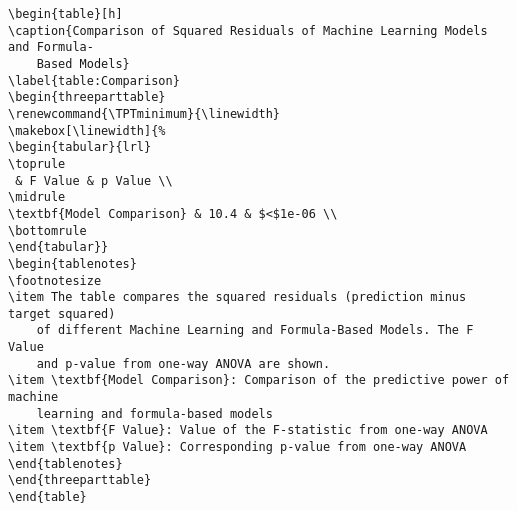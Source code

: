 \documentclass[11pt]{article}
\begin{document}
\begin{Verbatim}[tabsize=4]
\begin{table}[h]
\caption{Comparison of Squared Residuals of Machine Learning Models and Formula-
	Based Models}
\label{table:Comparison}
\begin{threeparttable}
\renewcommand{\TPTminimum}{\linewidth}
\makebox[\linewidth]{%
\begin{tabular}{lrl}
\toprule
 & F Value & p Value \\
\midrule
\textbf{Model Comparison} & 10.4 & $<$1e-06 \\
\bottomrule
\end{tabular}}
\begin{tablenotes}
\footnotesize
\item The table compares the squared residuals (prediction minus target squared)
	of different Machine Learning and Formula-Based Models. The F Value
	and p-value from one-way ANOVA are shown.
\item \textbf{Model Comparison}: Comparison of the predictive power of machine
	learning and formula-based models
\item \textbf{F Value}: Value of the F-statistic from one-way ANOVA
\item \textbf{p Value}: Corresponding p-value from one-way ANOVA
\end{tablenotes}
\end{threeparttable}
\end{table}

\end{Verbatim}




\end{document}
